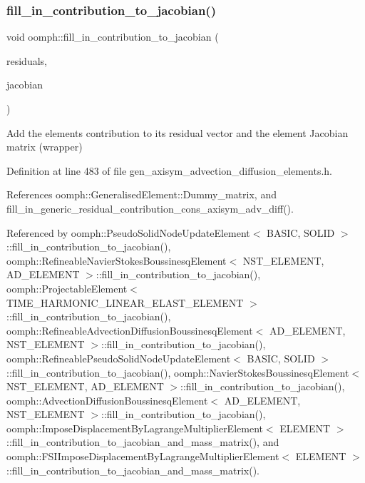 \subsubsection{\texorpdfstring{fill\+\_\+in\+\_\+contribution\+\_\+to\+\_\+jacobian()}{fill\_in\_contribution\_to\_jacobian()}}
{\footnotesize\ttfamily void oomph\+::fill\+\_\+in\+\_\+contribution\+\_\+to\+\_\+jacobian (\begin{DoxyParamCaption}\item[{\hyperlink{classoomph_1_1Vector}{Vector}$<$ double $>$ \&}]{residuals,  }\item[{\hyperlink{classoomph_1_1DenseMatrix}{Dense\+Matrix}$<$ double $>$ \&}]{jacobian }\end{DoxyParamCaption})}



Add the element\textquotesingle{}s contribution to its residual vector and the element Jacobian matrix (wrapper) 



Definition at line 483 of file gen\+\_\+axisym\+\_\+advection\+\_\+diffusion\+\_\+elements.\+h.



References oomph\+::\+Generalised\+Element\+::\+Dummy\+\_\+matrix, and fill\+\_\+in\+\_\+generic\+\_\+residual\+\_\+contribution\+\_\+cons\+\_\+axisym\+\_\+adv\+\_\+diff().



Referenced by oomph\+::\+Pseudo\+Solid\+Node\+Update\+Element$<$ B\+A\+S\+I\+C, S\+O\+L\+I\+D $>$\+::fill\+\_\+in\+\_\+contribution\+\_\+to\+\_\+jacobian(), oomph\+::\+Refineable\+Navier\+Stokes\+Boussinesq\+Element$<$ N\+S\+T\+\_\+\+E\+L\+E\+M\+E\+N\+T, A\+D\+\_\+\+E\+L\+E\+M\+E\+N\+T $>$\+::fill\+\_\+in\+\_\+contribution\+\_\+to\+\_\+jacobian(), oomph\+::\+Projectable\+Element$<$ T\+I\+M\+E\+\_\+\+H\+A\+R\+M\+O\+N\+I\+C\+\_\+\+L\+I\+N\+E\+A\+R\+\_\+\+E\+L\+A\+S\+T\+\_\+\+E\+L\+E\+M\+E\+N\+T $>$\+::fill\+\_\+in\+\_\+contribution\+\_\+to\+\_\+jacobian(), oomph\+::\+Refineable\+Advection\+Diffusion\+Boussinesq\+Element$<$ A\+D\+\_\+\+E\+L\+E\+M\+E\+N\+T, N\+S\+T\+\_\+\+E\+L\+E\+M\+E\+N\+T $>$\+::fill\+\_\+in\+\_\+contribution\+\_\+to\+\_\+jacobian(), oomph\+::\+Refineable\+Pseudo\+Solid\+Node\+Update\+Element$<$ B\+A\+S\+I\+C, S\+O\+L\+I\+D $>$\+::fill\+\_\+in\+\_\+contribution\+\_\+to\+\_\+jacobian(), oomph\+::\+Navier\+Stokes\+Boussinesq\+Element$<$ N\+S\+T\+\_\+\+E\+L\+E\+M\+E\+N\+T, A\+D\+\_\+\+E\+L\+E\+M\+E\+N\+T $>$\+::fill\+\_\+in\+\_\+contribution\+\_\+to\+\_\+jacobian(), oomph\+::\+Advection\+Diffusion\+Boussinesq\+Element$<$ A\+D\+\_\+\+E\+L\+E\+M\+E\+N\+T, N\+S\+T\+\_\+\+E\+L\+E\+M\+E\+N\+T $>$\+::fill\+\_\+in\+\_\+contribution\+\_\+to\+\_\+jacobian(), oomph\+::\+Impose\+Displacement\+By\+Lagrange\+Multiplier\+Element$<$ E\+L\+E\+M\+E\+N\+T $>$\+::fill\+\_\+in\+\_\+contribution\+\_\+to\+\_\+jacobian\+\_\+and\+\_\+mass\+\_\+matrix(), and oomph\+::\+F\+S\+I\+Impose\+Displacement\+By\+Lagrange\+Multiplier\+Element$<$ E\+L\+E\+M\+E\+N\+T $>$\+::fill\+\_\+in\+\_\+contribution\+\_\+to\+\_\+jacobian\+\_\+and\+\_\+mass\+\_\+matrix().

